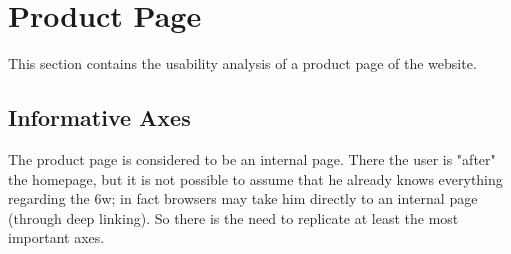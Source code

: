 \section{Product Page}
This section contains the usability analysis of a product page of the website.

\subsection{Informative Axes}
The product page is considered to be an internal page. There the user is "after" the homepage,
but it is not possible to assume that he already knows everything regarding the 6w; 
in fact browsers may take him directly to an internal page (through deep linking). 
So there is the need to replicate at least the most important axes.





